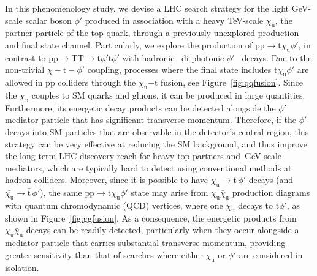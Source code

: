 In this phenomenology study, we devise a LHC search strategy for the light \textrm{GeV}-scale scalar boson $\phi'$ produced in association with a heavy \textrm{TeV}-scale $\chi_\mathrm{u}$, the partner particle of the top quark, through a previously unexplored production and final state channel. Particularly, we explore the production of $\mathrm{pp}\to \mathrm{t}\chi_\mathrm{u} \phi'$, in contrast to $\mathrm{pp}\to \mathrm{T}\mathrm{T}\to \mathrm{t}\phi'\mathrm{t}\phi'$ with hadronic~\parencite{Bhardwaj_2022, Bhardwaj_2022_2, Bardhan_2023} di-photonic $\phi'$~\parencite{Banerjee_2016, Alves_2024} decays. Due to the non-trivial $\chi - \mathrm{t} -\phi'$ coupling, processes where the final state includes $ \mathrm{t}\chi_\mathrm{u} \phi'$ are allowed in \textrm{pp} colliders through the ${\chi_\mathrm{u}}{- \mathrm{t}}$ fusion, see Figure~\ref{fig:qqfusion}. Since the $\chi_\mathrm{u}$ couples to SM quarks and gluons, it can be produced in large quantities. Furthermore, its energetic decay products can be detected alongside the $\phi'$ mediator particle that has significant transverse momentum. Therefore, if the $\phi'$ decays into SM particles that are observable in the detector's central region, this strategy can be very effective at reducing the SM background, and thus improve the long-term LHC discovery reach for heavy top partners and~\textrm{GeV}-scale mediators, which are typically hard to detect using conventional methods at hadron colliders. Moreover, since it is possible to have $\chi_\mathrm{u} \to \mathrm{t}\,\phi'$ decays (and $\bar{\chi_\mathrm{u}} \to \bar{\mathrm{t}}\,\phi'$), the same $\mathrm{pp}\to \mathrm{t}\chi_\mathrm{u} \phi'$ state may arise from $\chi_\mathrm{u}\bar\chi_\mathrm{u}$ production diagrams with quantum chromodynamic (QCD) vertices, where one $\chi_\mathrm{u}$ decays to $\mathrm{t}\phi'$, 
as shown in Figure~\ref{fig:ggfusion}. As a consequence, the energetic products from $\chi_\mathrm{u}\bar\chi_\mathrm{u}$ decays can be readily detected, particularly when they occur alongside a mediator particle that carries substantial transverse momentum, providing greater sensitivity than that of searches where either $\chi_\mathrm{u}$ or $\phi'$ are considered in isolation. 

